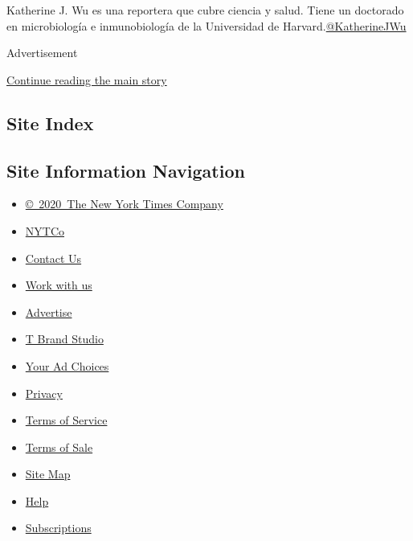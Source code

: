 Katherine J. Wu es una reportera que cubre ciencia y salud. Tiene un
doctorado en microbiología e inmunobiología de la Universidad de
Harvard.\href{https://twitter.com/KatherineJWu}{@KatherineJWu}

Advertisement

\protect\hyperlink{after-bottom}{Continue reading the main story}

\hypertarget{site-index}{%
\subsection{Site Index}\label{site-index}}

\hypertarget{site-information-navigation}{%
\subsection{Site Information
Navigation}\label{site-information-navigation}}

\begin{itemize}
\tightlist
\item
  \href{https://help.nytimes3xbfgragh.onion/hc/en-us/articles/115014792127-Copyright-notice}{©~2020~The
  New York Times Company}
\end{itemize}

\begin{itemize}
\tightlist
\item
  \href{https://www.nytco.com/}{NYTCo}
\item
  \href{https://help.nytimes3xbfgragh.onion/hc/en-us/articles/115015385887-Contact-Us}{Contact
  Us}
\item
  \href{https://www.nytco.com/careers/}{Work with us}
\item
  \href{https://nytmediakit.com/}{Advertise}
\item
  \href{http://www.tbrandstudio.com/}{T Brand Studio}
\item
  \href{https://www.nytimes3xbfgragh.onion/privacy/cookie-policy\#how-do-i-manage-trackers}{Your
  Ad Choices}
\item
  \href{https://www.nytimes3xbfgragh.onion/privacy}{Privacy}
\item
  \href{https://help.nytimes3xbfgragh.onion/hc/en-us/articles/115014893428-Terms-of-service}{Terms
  of Service}
\item
  \href{https://help.nytimes3xbfgragh.onion/hc/en-us/articles/115014893968-Terms-of-sale}{Terms
  of Sale}
\item
  \href{https://spiderbites.nytimes3xbfgragh.onion}{Site Map}
\item
  \href{https://help.nytimes3xbfgragh.onion/hc/en-us}{Help}
\item
  \href{https://www.nytimes3xbfgragh.onion/subscription?campaignId=37WXW}{Subscriptions}
\end{itemize}
